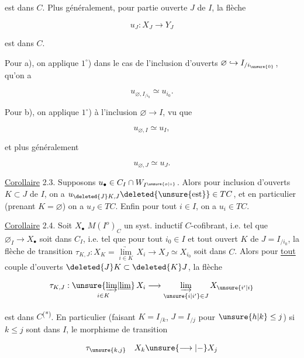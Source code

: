 est dans $C$. Plus généralement, pour  partie ouverte $J$ de $I$, la flèche

\[
 u_J:X_J\longrightarrow Y_J\tag*{(2.2.2)}
\]

est dans $C$.



Pour a), on applique $1^\circ$)  dans le cas de l'inclusion d'ouverts $\varnothing\hookrightarrow I_{/i_{\unsure{0}}}$,  qu'on a

\[
 u_{\varnothing,I_{/i_0}}\simeq u_{i_0}.
\]

Pour b), on applique $1^\circ$) à l'inclusion $\varnothing\longrightarrow I$, vu que

\[
 u_{\varnothing,I}\simeq u_I,
\]

et plus généralement

\[
 u_{\varnothing,J}\simeq u_J.
\]

\uline{Corollaire} 2.3. Supposons $u_\bullet\in C_I\cap W_{I^{\unsure{o|\circ}}}$. Alors  pour   inclusion d'ouverts $K\subset J$ de $I$, on a $u_{\deleted{J}K,J}\deleted{\unsure{\text{est}}}\in TC$, et en particulier  (prenant $K=\varnothing$) on a $u_J\in TC$. Enfin pour tout $i\in I$, on a $u_i\in TC$.

\uline{Corollaire} 2.4.  Soit $X_\bullet$  $M(I^o)_C$ un syst. inductif $C$-cofibrant, i.e. tel que $\varnothing_I\longrightarrow X_\bullet$ soit dans $C_I$, i.e. tel que  pour tout $i_0\in I$ et tout ouvert $K$ de $J=I_{/i_0}$, la flèche de transition $\tau_{K,J}:X_K=\underset{i\in K}{\underrightarrow{\lim}}\,X_i\longrightarrow X_J\simeq X_{i_0}$ soit dans $C$. Alors pour \uline{tout} couple d'ouverts $\deleted{J}K\subset\deleted{K}J$, la flèche 

\[
 \tau_{K,J}:\underset{i\in K}{\unsure{\underrightarrow{\lim}|\underline{\lim}}}\,X_i
 \longrightarrow\underset{\unsure{i|i'}\in J}{\underrightarrow{\lim}}\,X_{\unsure{i'|i}}
\]

est dans $C$\textsuperscript{(*)}. 
En particulier (faisant $K=I_{/k}$, $J=I_{/j}$ pour $\unsure{h|k}\le j$) si $k\le j$ sont dans $I$, le morphisme de transition

\[
 \tau_{\unsure{k,j}}\quad X_k\unsure{\longrightarrow|-}X_j
\]

